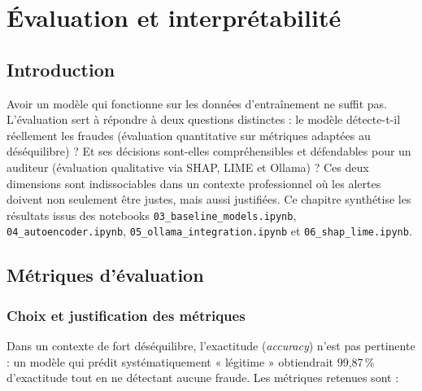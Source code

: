 \chapter{Évaluation et interprétabilité}

\section*{Introduction}

Avoir un modèle qui fonctionne sur les données d'entraînement ne suffit pas. L'évaluation
sert à répondre à deux questions distinctes : le modèle détecte-t-il réellement les fraudes
(évaluation quantitative sur métriques adaptées au déséquilibre) ? Et ses décisions
sont-elles compréhensibles et défendables pour un auditeur (évaluation qualitative via
SHAP, LIME et Ollama) ? Ces deux dimensions sont indissociables dans un contexte professionnel
où les alertes doivent non seulement être justes, mais aussi justifiées. Ce chapitre
synthétise les résultats issus des notebooks \texttt{03\_baseline\_models.ipynb},
\texttt{04\_autoencoder.ipynb}, \texttt{05\_ollama\_integration.ipynb} et
\texttt{06\_shap\_lime.ipynb}.

\section{Métriques d'évaluation}

\subsection{Choix et justification des métriques}

Dans un contexte de fort déséquilibre, l'exactitude (\textit{accuracy}) n'est pas
pertinente : un modèle qui prédit systématiquement « légitime » obtiendrait 99,87\,\%
d'exactitude tout en ne détectant aucune fraude. Les métriques retenues sont :

